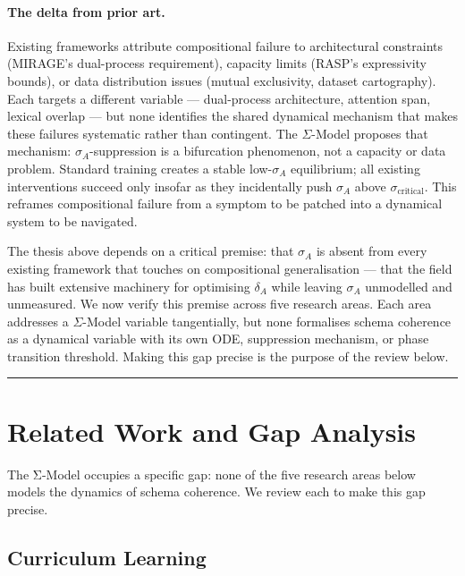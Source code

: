 \paragraph{The delta from prior art.}
Existing frameworks attribute compositional failure to architectural
constraints (MIRAGE's dual-process requirement), capacity limits
(RASP's expressivity bounds), or data distribution issues (mutual
exclusivity, dataset cartography). Each targets a different variable
--- dual-process architecture, attention span, lexical overlap --- but
none identifies the shared dynamical mechanism that makes these
failures systematic rather than contingent. The $\Sigma$-Model
proposes that mechanism: $\sigma_A$-suppression is a bifurcation
phenomenon, not a capacity or data problem. Standard training creates
a stable low-$\sigma_A$ equilibrium; all existing interventions succeed
only insofar as they incidentally push $\sigma_A$ above
$\sigma_{\text{critical}}$. This reframes compositional failure from a
symptom to be patched into a dynamical system to be navigated.

The thesis above depends on a critical premise: that $\sigma_A$ is
absent from every existing framework that touches on compositional
generalisation --- that the field has built extensive machinery for
optimising $\delta_A$ while leaving $\sigma_A$ unmodelled and
unmeasured. We now verify this premise across five research areas.
Each area addresses a $\Sigma$-Model variable tangentially, but none
formalises schema coherence as a dynamical variable with its own ODE,
suppression mechanism, or phase transition threshold. Making this gap
precise is the purpose of the review below.

\noindent\rule{\linewidth}{0.4pt}

\section{Related Work and Gap Analysis}\label{sec:related-work}

The Σ-Model occupies a specific gap: none of the five research areas below models the dynamics of schema coherence. We review each to make this gap precise.

\subsection{Curriculum Learning}\label{sec:curriculum-learning}

